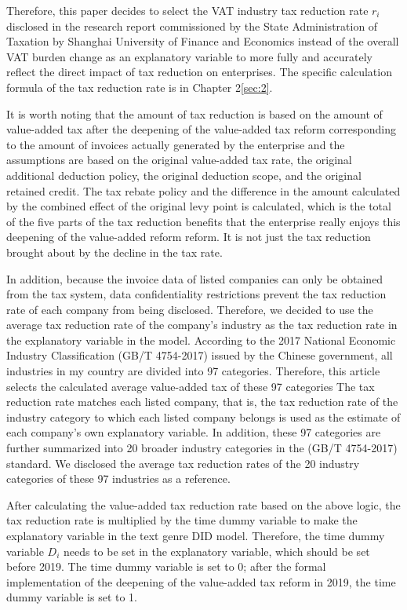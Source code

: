 \documentclass[3p,times]{elsarticle}
\begin{document}
Therefore, this paper decides to select the VAT industry tax reduction rate $r_i$ disclosed in the research report commissioned by the State Administration of Taxation by Shanghai University of Finance and Economics instead of the overall VAT burden change as an explanatory variable to more fully and accurately reflect the direct impact of tax reduction on enterprises. The specific calculation formula of the tax reduction rate is in {\color{red} Chapter 2\ref{sec:2}}.

It is worth noting that the amount of tax reduction is based on the amount of value-added tax after the deepening of the value-added tax reform corresponding to the amount of invoices actually generated by the enterprise and the assumptions are based on the original value-added tax rate, the original additional deduction policy, the original deduction scope, and the original retained credit. The tax rebate policy and the difference in the amount calculated by the combined effect of the original levy point is calculated, which is the total of the five parts of the tax reduction benefits that the enterprise really enjoys this deepening of the value-added reform reform. It is not just the tax reduction brought about by the decline in the tax rate.

In addition, because the invoice data of listed companies can only be obtained from the tax system, data confidentiality restrictions prevent the tax reduction rate of each company from being disclosed. Therefore, we decided to use the average tax reduction rate of the company's industry as the tax reduction rate in the explanatory variable in the model. According to the 2017 National Economic Industry Classification (GB/T 4754-2017) issued by the Chinese government, all industries in my country are divided into 97 categories. Therefore, this article selects the calculated average value-added tax of these 97 categories The tax reduction rate matches each listed company, that is, the tax reduction rate of the industry category to which each listed company belongs is used as the estimate of each company's own explanatory variable. In addition, these 97 categories are further summarized into 20 broader industry categories in the (GB/T 4754-2017) standard. We disclosed the average tax reduction rates of the 20 industry categories of these 97 industries as a reference.

After calculating the value-added tax reduction rate based on the above logic, the tax reduction rate is multiplied by the time dummy variable to make the explanatory variable in the text genre DID model. Therefore, the time dummy variable $D_i$ needs to be set in the explanatory variable, which should be set before 2019. The time dummy variable is set to 0; after the formal implementation of the deepening of the value-added tax reform in 2019, the time dummy variable is set to 1.
\end{document}
